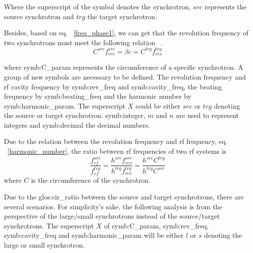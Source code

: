 Where the superscript of the symbol denotes the synchrotron, $\mathit{src}$ represents the source synchrotron and $\mathit{trg}$ the target synchrotron.

Besides, based on eq. ~\ref{freq_phase1}, we can get that the revolution frequency of two synchrotrons must meet the following relation ~\cite{garoby_timing_1984}.
\begin{equation}
	C^{\mathit{src}}f_{rev}^{\mathit{src}} = \beta c=C^{\mathit{trg}}f_{rev}^{\mathit{trg}}
\end{equation}

where \gls{symb:C_param} represents the circumference of a specific synchrotron. A group of new symbols are necessary to be defined. The revolution frequency and rf cavity frequency by \gls{symb:rev_freq} and \gls{symb:cavity_freq}, the beating frequency by \gls{symb:beating_freq} and the harmonic number by \gls{symb:harmonic_param}. The superscript $X$ could be either $src$ or $trg$ denoting the source or target synchrotron. \gls{symb:integer}, $m$ and $n$ are used to represent integers and \gls{symb:decimal} the decimal numbers.

Due to the relation between the revolution frequency and rf frequency, eq. ~\ref{harmonic_number}, the ratio between rf frequencies of two rf systems is
\begin{equation}
	\frac{f_{rf}^{\mathit{src}}}{f_{rf}^{\mathit{trg}}}=\frac{h^{\mathit{src}}f_{rev}^{\mathit{src}}}{h^{\mathit{trg}}f_{rev}^{\mathit{trg}}}=\frac{h^{\mathit{src}}C^{\mathit{trg}}}{h^{\mathit{trg}}C^{\mathit{src}}}
\end{equation}
where $C$ is the circumference of the synchrotron. 

Due to the \gls{glos:cir_ratio} between the source and target synchrotrons, there are several scenarios. For simplicity's sake, the following analysis is from the perspective of the large/small synchrotrons instead of the source/target synchrotrons. The superscript $X$ of \gls{symb:C_param}, \gls{symb:rev_freq}, \gls{symb:cavity_freq} and \gls{symb:harmonic_param} will be either $l$ or $s$ denoting the large or small synchrotron.

